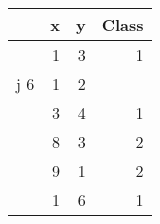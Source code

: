 \begin{tabular}{rrrr}
\toprule
  & x & y & Class  \\
\midrule
 & 1  & 3  & 1     \\
 j 6  & 1  & 2     \\
 & 3  & 4  & 1      \\
 & 8  & 3  & 2     \\
 & 9  & 1  & 2     \\
 & 1  & 6  & 1 	\\     
\bottomrule
\end{tabular}
